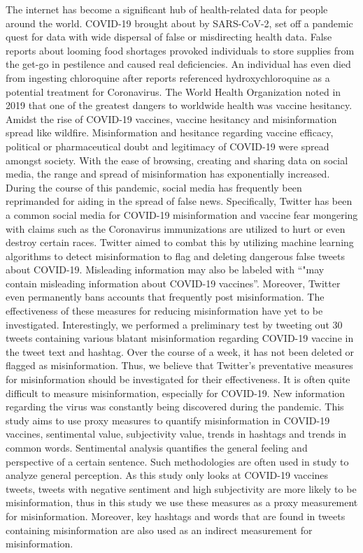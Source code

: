 \documentclass[10pt,twocolumn,letterpaper]{article}
\begin{document}
The internet has become a significant hub of health-related data for people around the world. COVID-19 brought about by SARS-CoV-2, set off a pandemic quest for data with wide dispersal of false or misdirecting health data. False reports about looming food shortages provoked individuals to store supplies from the get-go in pestilence and caused real deficiencies. An individual has even died from ingesting chloroquine after reports referenced hydroxychloroquine as a potential treatment for Coronavirus.\cite{who_2020}
The World Health Organization noted in 2019 that one of the greatest dangers to worldwide health was vaccine hesitancy.\cite{PubMed33769946} Amidst the rise of COVID-19 vaccines, vaccine hesitancy and misinformation spread like wildfire. Misinformation and hesitance regarding vaccine efficacy, political or pharmaceutical doubt and legitimacy of COVID-19 were spread amongst society. With the ease of browsing, creating and sharing data on social media, the range and spread of misinformation has exponentially increased.
During the course of this pandemic, social media has frequently been reprimanded for aiding in the spread of false news. Specifically, Twitter has been a common social media for COVID-19 misinformation and vaccine fear mongering with claims such as the Coronavirus immunizations are utilized to hurt or even destroy certain races.\cite{e23279} Twitter aimed to combat this by utilizing machine learning algorithms to detect misinformation to flag and deleting dangerous false tweets about COVID-19. Misleading information may also be labeled with “"may contain misleading information about COVID-19 vaccines”. Moreover, Twitter even permanently bans accounts that frequently post misinformation. The effectiveness of these measures for reducing misinformation have yet to be investigated.\cite{inc._2021}
Interestingly, we performed a preliminary test by tweeting out 30 tweets containing various blatant misinformation regarding COVID-19 vaccine in the tweet text and hashtag. Over the course of a week, it has not been deleted or flagged as misinformation. Thus, we believe that Twitter’s preventative measures for misinformation should be investigated for their effectiveness.
It is often quite difficult to measure misinformation, especially for COVID-19. New information regarding the virus was constantly being discovered during the pandemic. This study aims to use proxy measures to quantify misinformation in COVID-19 vaccines, sentimental value, subjectivity value, trends in hashtags and trends in common words. Sentimental analysis quantifies the general feeling and perspective of a certain sentence. Such methodologies are often used in study to analyze general perception. As this study only looks at COVID-19 vaccines tweets, tweets with negative sentiment and high subjectivity are more likely to be misinformation, thus in this study we use these measures as a proxy measurement for misinformation. Moreover, key hashtags and words that are found in tweets containing misinformation are also used as an indirect measurement for misinformation. 
\end{document}
